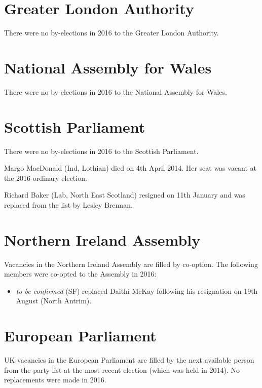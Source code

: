 \documentclass[a4paper,openany]{book}
\begin{document}
\section{Greater London Authority}

There were no by-elections in 2016 to the Greater London Authority.

\section{National Assembly for Wales}

There were no by-elections in 2016 to the National Assembly for Wales.

\section{Scottish Parliament}

There were no by-elections in 2016 to the Scottish Parliament.

Margo MacDonald (Ind, Lothian) died on 4th April 2014.  Her seat was vacant at the 2016 ordinary election.

Richard Baker (Lab, North East Scotland) resigned on 11th January and was replaced from the list by Lesley Brennan.

\section{Northern Ireland Assembly}

Vacancies in the Northern Ireland Assembly are filled by co-option.
%
The following members were co-opted to the Assembly in 2016:
\begin{itemize}
\item \emph{to be confirmed} (SF) replaced Daith\'i McKay following his resignation on 19th August (North Antrim).
\end{itemize}

\section{European Parliament}

UK vacancies in the European Parliament are filled by the next available person from the party list at the most recent election (which was held in 2014). 
No replacements were made in 2016.
\end{document}
